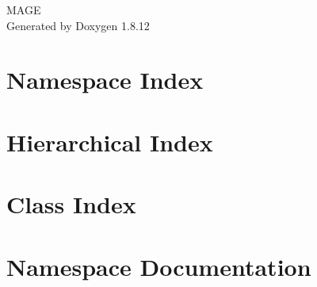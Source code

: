 \documentclass[twoside]{book}
\newcommand{\+}{\discretionary{\mbox{\scriptsize$\hookleftarrow$}}{}{}}
\newcommand{\clearemptydoublepage}{%
  \newpage{\pagestyle{empty}\cleardoublepage}%
}
\begin{document}
\hypersetup{pageanchor=false,
             bookmarksnumbered=true,
             pdfencoding=unicode
            }
\begin{titlepage}
\vspace*{7cm}
\begin{center}%
{\Large M\+A\+GE }\\
\vspace*{1cm}
{\large Generated by Doxygen 1.8.12}\\
\end{center}
\end{titlepage}
\clearemptydoublepage
{}
\tableofcontents
\clearemptydoublepage
{}
\hypersetup{pageanchor=true}

\chapter{Namespace Index}

\chapter{Hierarchical Index}

\chapter{Class Index}

\chapter{Namespace Documentation}

\end{document}
